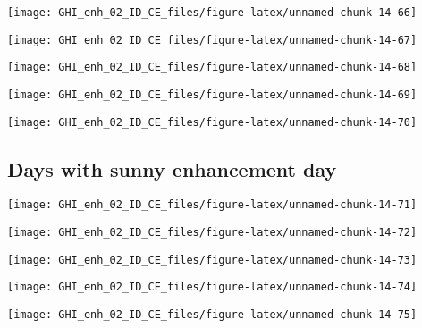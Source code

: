 \documentclass[
  10pt,
  a4paper,oneside]{article}
\begin{document}
\begin{center}\texttt{[image: GHI\_enh\_02\_ID\_CE\_files/figure-latex/unnamed-chunk-14-66]} \end{center}

\begin{center}\texttt{[image: GHI\_enh\_02\_ID\_CE\_files/figure-latex/unnamed-chunk-14-67]} \end{center}

\begin{center}\texttt{[image: GHI\_enh\_02\_ID\_CE\_files/figure-latex/unnamed-chunk-14-68]} \end{center}

\begin{center}\texttt{[image: GHI\_enh\_02\_ID\_CE\_files/figure-latex/unnamed-chunk-14-69]} \end{center}

\begin{center}\texttt{[image: GHI\_enh\_02\_ID\_CE\_files/figure-latex/unnamed-chunk-14-70]} \end{center}

\FloatBarrier

\hypertarget{days-with-sunny-enhancement-day}{%
\subsection{Days with sunny enhancement day}\label{days-with-sunny-enhancement-day}}

\begin{center}\texttt{[image: GHI\_enh\_02\_ID\_CE\_files/figure-latex/unnamed-chunk-14-71]} \end{center}

\begin{center}\texttt{[image: GHI\_enh\_02\_ID\_CE\_files/figure-latex/unnamed-chunk-14-72]} \end{center}

\begin{center}\texttt{[image: GHI\_enh\_02\_ID\_CE\_files/figure-latex/unnamed-chunk-14-73]} \end{center}

\begin{center}\texttt{[image: GHI\_enh\_02\_ID\_CE\_files/figure-latex/unnamed-chunk-14-74]} \end{center}

\begin{center}\texttt{[image: GHI\_enh\_02\_ID\_CE\_files/figure-latex/unnamed-chunk-14-75]} \end{center}
\end{document}
